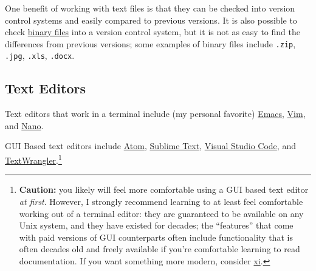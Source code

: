 \documentclass[12pt,letterpaper,twoside]{article}
\begin{document}
One benefit of working with text files is that they can be checked into
version control systems and easily compared to previous versions.  It is also
possible to check \href{https://en.wikipedia.org/wiki/Binary_file}{binary files} 
into a version control system, but it is not as
easy to find the differences from previous versions;
some examples of binary files include
\texttt{.zip}, \texttt{.jpg}, \texttt{.xls}, \texttt{.docx}.

\vspace{-14pt}
\subsection{Text Editors}

Text editors that work in a terminal include (my personal favorite)
\href{https://www.gnu.org/software/emacs/}{Emacs},
\href{http://www.vim.org/}{Vim}, and
\href{https://www.nano-editor.org/}{Nano}. 

GUI Based text editors include \href{https://atom.io/}{Atom}, 
\href{https://www.sublimetext.com/}{Sublime Text},
\href{https://code.visualstudio.com/}{Visual Studio Code},
and
\href{http://www.barebones.com/products/textwrangler/}{TextWrangler}.\footnote{
  \textbf{Caution:} 
  you likely will feel more comfortable using a GUI based text editor
  \emph{at first}. However, I strongly recommend learning to at least
  feel comfortable working out of a terminal editor: they are guaranteed
  to be available on any Unix system, and they have existed for decades;
  the ``features''  that come with paid versions of GUI counterparts
  often include functionality that is often decades old and freely
  available if you're comfortable learning to read documentation.
If you want something more
modern, consider
\href{https://github.com/xi-editor/xi-editor}{xi}.
}
\vspace{-28pt}
\end{document}
